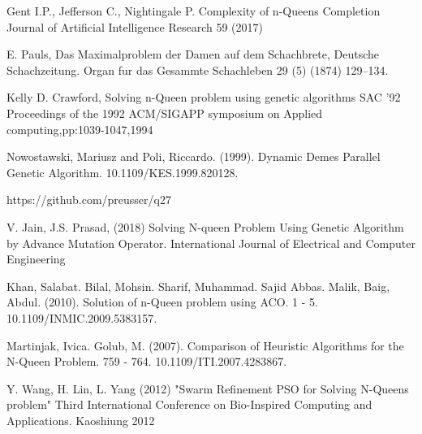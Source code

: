 \documentclass[a4paper,onecolumn,11pt]{article}
\begin{document}
\begin{thebibliography}{99.}

 Gent I.P., Jefferson C., Nightingale P. 	Complexity of n-Queens Completion Journal of Artificial Intelligence Research 59 (2017) 

 E. Pauls, Das Maximalproblem der Damen auf dem Schachbrete, Deutsche Schachzeitung. Organ fur das Gesammte Schachleben 29 (5) (1874) 129–134.

 Kelly D. Crawford, Solving n-Queen problem using genetic algorithms SAC '92 Proceedings of the 1992 ACM/SIGAPP symposium on Applied computing,pp:1039-1047,1994 

 Nowostawski, Mariusz and Poli, Riccardo. (1999). Dynamic Demes Parallel Genetic Algorithm. 10.1109/KES.1999.820128. 

 https://github.com/preusser/q27

 V. Jain, J.S. Prasad, (2018) Solving N-queen Problem Using Genetic Algorithm by Advance Mutation Operator. International Journal of Electrical and Computer Engineering

 Khan, Salabat. Bilal, Mohsin. Sharif, Muhammad. Sajid Abbas. Malik, Baig, Abdul. (2010). Solution of n-Queen problem using ACO. 1 - 5. 10.1109/INMIC.2009.5383157. 

 Martinjak, Ivica. Golub, M. (2007). Comparison of Heuristic Algorithms for the N-Queen Problem. 759 - 764. 10.1109/ITI.2007.4283867.

  Y. Wang, H. Lin, L. Yang (2012) "Swarm Refinement PSO for Solving N-Queens problem" Third International Conference on Bio-Inspired Computing and Applications. Kaoshiung 2012




\end{thebibliography}
\end{document}
